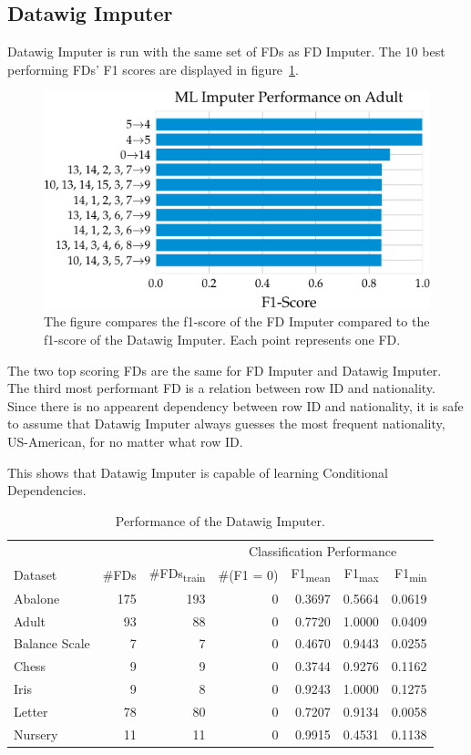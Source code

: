 \subsection{Datawig Imputer}
Datawig Imputer is run with the same set of FDs as FD Imputer.
The 10 best performing FDs' F1 scores are displayed in figure~\ref{fig:f1_ml_adult}.
\begin{figure}[ht]
     \centering
     \includegraphics[width=.8\textwidth]{../figures/adult/f1_ml_imputer_adult.pdf}
     \caption{The figure compares the f1-score of the FD Imputer compared to the f1-score of the Datawig Imputer. Each point represents one FD.}
     \label{fig:f1_ml_adult}
 \end{figure}
The two top scoring FDs are the same for FD Imputer and Datawig Imputer.
The third most performant FD is a relation between row ID and nationality.
Since there is no appearent dependency between row ID and nationality, it is safe to assume that Datawig Imputer always guesses the most frequent nationality, US-American, for no matter what row ID.

This shows that Datawig Imputer is capable of learning Conditional Dependencies.

\begin{table}[ht]
    \centering
    \begin{tabular}{lrrrrrr}
        \toprule
        & & & \multicolumn{4}{c}{Classification Performance} \\
        \cmidrule(lr{.25em}){4-7}
        Dataset & \#FDs & \#FDs\textsubscript{train} & \#(F1 = 0) & F1\textsubscript{mean} & F1\textsubscript{max} & F1\textsubscript{min} \\
        \midrule
        Abalone & 175 & 193 & 0 & 0.3697 & 0.5664 & 0.0619 \\
        Adult & 93 & 88 & 0 & 0.7720 & 1.0000 & 0.0409 \\
        Balance Scale & 7 & 7 & 0 & 0.4670 & 0.9443 & 0.0255 \\
        Chess & 9 & 9 & 0 & 0.3744 & 0.9276 & 0.1162 \\
        Iris & 9 & 8 & 0 & 0.9243 & 1.0000 & 0.1275 \\
        Letter & 78 & 80 & 0 & 0.7207 & 0.9134 & 0.0058 \\
        Nursery & 11 & 11 & 0 & 0.9915 & 0.4531 & 0.1138 \\
        \bottomrule
    \end{tabular}
    \caption{Performance of the Datawig Imputer.}\label{tab:ml-imputer-performance}
\end{table}

